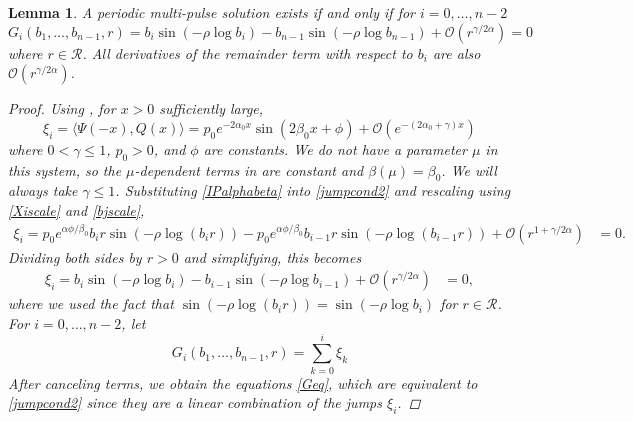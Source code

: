\documentclass[10pt,reqno]{amsart}
\theoremstyle{plain}
\newtheorem{lemma}[theorem]{Lemma}
\theoremstyle{definition}
\theoremstyle{remark}
\numberwithin{theorem}{section}
\numberwithin{equation}{section}
\begin{document}
\begin{lemma}\label{jumplemma3}
A periodic multi-pulse solution exists if and only if for $i = 0, \dots, n-2$
\begin{equation}\label{Geq}
G_i(b_1, \dots, b_{n-1}, r) = b_i \sin \left( -\rho \log b_i \right) - b_{n-1} \sin \left( -\rho \log b_{n-1} \right) + \mathcal{O}(r^{\gamma / 2 \alpha}) = 0
\end{equation}
where $r \in \mathcal{R}$. All derivatives of the remainder term with respect to $b_i$ are also $\mathcal{O}(r^{\gamma / 2 \alpha})$. 
\begin{proof}
Using \cite[Lemma 6.1(i)]{Sandstede1998}, for $x > 0$ sufficiently large,
\begin{equation}\label{IPalphabeta}
\xi_i = \langle \Psi(-x), Q(x) \rangle
= p_0 e^{-2 \alpha_0 x} \sin(2 \beta_0 x + \phi) + \mathcal{O}(e^{-(2 \alpha_0 + \gamma) x})
\end{equation}
where $0 < \gamma \leq 1$, $p_0 > 0$, and $\phi$ are constants. We do not have a parameter $\mu$ in this system, so the $\mu$-dependent terms in \cite[Lemma 6.1(i)]{Sandstede1998} are constant and $\beta(\mu) = \beta_0$. We will always take $\gamma \leq 1$. Substituting \cref{IPalphabeta} into \cref{jumpcond2} and rescaling using \cref{Xiscale} and \cref{bjscale},
\begin{align}\label{diff2}
\xi_i = p_0 e^{\alpha \phi / \beta_0 } b_i r \sin \left( - \rho \log (b_i r) \right) - p_0 e^{\alpha \phi / \beta_0 } b_{i-1} r \sin \left( -\rho \log (b_{i-1} r) \right) + \mathcal{O}(r^{1 + \gamma / 2 \alpha}) &= 0.
\end{align}
Dividing both sides by $r > 0$ and simplifying, this becomes
\begin{align}\label{diff3}
\xi_i = b_i \sin \left( -\rho \log b_i \right) - b_{i-1} \sin \left( -\rho \log b_{i-1} \right) + \mathcal{O}(r^{\gamma / 2 \alpha}) &= 0,
\end{align} 
where we used the fact that $\sin \left( -\rho \log (b_i r) \right) = \sin \left( -\rho \log b_i \right)$ for $r \in \mathcal{R}$. For $i = 0, \dots, n-2$, let
\begin{equation}\label{Gidef}
G_i(b_1, \dots, b_{n-1}, r) = \sum_{k = 0}^i \xi_k
\end{equation}
After canceling terms, we obtain the equations \cref{Geq}, which are equivalent to \cref{jumpcond2} since they are a linear combination of the jumps $\xi_i$.
\end{proof}
\end{lemma}
\end{document}
